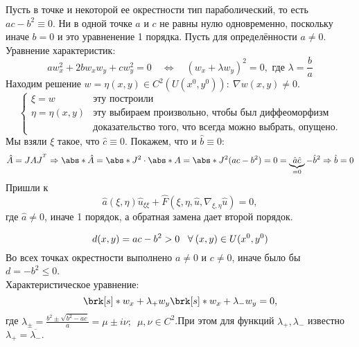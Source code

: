 \documentclass[../main.tex]{subfiles}
\begin{document}
Пусть в точке и некоторой ее окрестности тип параболический, то есть $ac - b^2 \equiv 0$. Ни в одной точке $a$ и $c$ не равны нулю одновременно, поскольку иначе $b = 0$ и это уравненение 1 порядка. Пусть для определённости $a \neq 0$. Уравнение характеристик:
$$
aw_x^2 + 2bw_x w_y+cw_y^2 = 0 
\quad\Leftrightarrow\quad 
(w_x + \lambda w_y)^2 = 0, 
\text{ где } \lambda =\frac{b}{a}
$$
Находим решение $w = \eta(x, y) \in C^2(U(x^0, y^0)):\ \nabla w(x, y) \ne 0$.
$$
\begin{cases}
	\xi = w & \text{эту построили} \\
  \eta = \eta(x,y) & \text{эту выбираем произвольно, чтобы был диффеоморфизм} \\
	& \text{доказательство того, что всегда можно выбрать, опущено.}
\end{cases}
$$
Мы взяли $\xi$ такое, что $\hat c \equiv 0$. Покажем, что и $\hat b \equiv 0$:
$$
\hat A = JAJ^\Transp \Rightarrow \abs*{\hat A} = \abs*{J}^2\cdot\abs*{A} = \abs*{J}^2(ac - b^2) = 0 = \underbrace{\hat a \hat c}_{=0} - \hat b^2 \Rightarrow \hat b = 0
$$
Пришли к 
$$
\hat a(\xi, \eta)\hat u_{\xi\xi} + \hat F(\xi, \eta, \hat u, \nabla_{\xi, \eta}\hat u) = 0,
$$
где $\hat a \neq 0$, иначе 1 порядок, а обратная замена дает второй порядок.

$$
d(x, y) = ac - b^2 > 0 \;\;\;\forall\: (x, y) \in U(x^0, y^0)
$$
Во всех точках окрестности выполнено $a\ne 0$ и $c\ne 0$, иначе было бы $d = -b^2 \leq 0$.\\ 
Характеристическое уравнение:
$$
\brk[s]*{w_x + \lambda_+w_y}\brk[s]*{w_x + \lambda_-w_y} = 0,
$$
где $\lambda_\pm = \frac{b^2\pm\sqrt{b^2 - ac}}{a} = \mu \pm i\nu; \;\ \mu, \nu \in C^2$.\quad При этом для функций $\lambda_+, \lambda_-$ известно $\lambda_+ = \overline{\lambda_-}.$
\vspace{0.3em}
\end{document}
